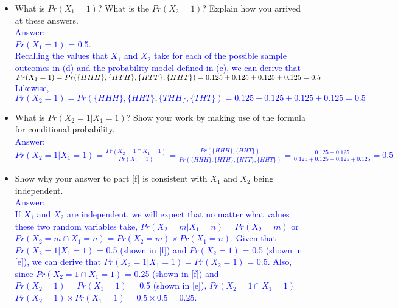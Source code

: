 \documentclass[letterpaper, 11pt]{article}
\begin{document}
\begin{itemize}
\textcolor{blue}{Answer:\\
$X_1(HHH) = 1, X_2(HHH) = 1; X_1(HTH) = 1, X_2(HTH) = 0; X_1(HTT) = 1, X_2(HTT) = 0; X_1(HHT) = 1, X_2(HHT) = 1; X_1(THH) = 0, X_2(THH) = 1; X_1(TTH) = 0, X_2(TTH) = 0; X_1(THT) = 0, X_2(THT) = 1; X_1(TTT) = 0, X_2(TTT) = 0$}\\


\item[e.] What is $Pr(X_1 = 1)$?  What is the $Pr(X_2 = 1)$?  Explain how you arrived at these answers.\\

\textcolor{blue}{Answer:\\
$Pr(X_1 = 1)$ = 0.5. \\
Recalling the values that $X_1$ and $X_2$ take for each of the possible sample outcomes in (d) and the probability model defined in (c), we can derive that $Pr(X_1 = 1) = \\
Pr(\{HHH\}, \{HTH\}, \{HTT\}, \{HHT\}) = 0.125 + 0.125 + 0.125 + 0.125 = 0.5$ \\
Likewise, $Pr(X_2 = 1) = Pr(\{HHH\}, \{HHT\}, \{THH\}, \{THT\}) = 0.125 + 0.125 + 0.125 + 0.125 = 0.5$}\\

\item[f.] What is $Pr(X_2 =1 | X_1 = 1)$?  Show your work by making use of the formula for conditional probability.\\

\textcolor{blue}{Answer:\\
$Pr(X_2 =1 | X_1 = 1) = \frac{Pr(X_2 = 1 \cap X_1 = 1)}{Pr(X_1 = 1)} = \frac{Pr(\{HHH\}, \{HHT\})}{Pr(\{HHH\}, \{HTH\}, \{HTT\}, \{HHT\})} = \frac{0.125 + 0.125}{0.125 + 0.125 + 0.125 + 0.125} = 0.5$ }\\

\item[g.] Show why your answer to part [f] is consistent with $X_1$ and $X_2$ being independent.\\


\textcolor{blue}{Answer:\\
If $X_1$ and $X_2$ are independent, we will expect that no matter what values these two random variables take, $Pr(X_2 = m| X_1 = n) = Pr(X_2 = m)$ or $Pr(X_2 = m \cap X_1 = n) = Pr(X_2 = m) \times Pr(X_1 = n)$. Given that $Pr(X_2 = 1 | X_1 = 1)$ = 0.5 (shown in [f]) and $Pr(X_2 = 1)$ = 0.5 (shown in [e]), we can derive that $Pr(X_2 =1 | X_1 = 1) = Pr(X_2 = 1)$ = 0.5. Also, since $Pr(X_2 = 1 \cap X_1 = 1)$ = 0.25 (shown in [f]) and $Pr(X_2 = 1) = Pr(X_1 = 1)$ = 0.5 (shown in [e]), $Pr(X_2 = 1 \cap X_1 = 1)$ = $Pr(X_2 = 1) \times Pr(X_1 = 1) = 0.5 \times 0.5 = 0.25$. 
}\\


\end{itemize}
\end{document}
